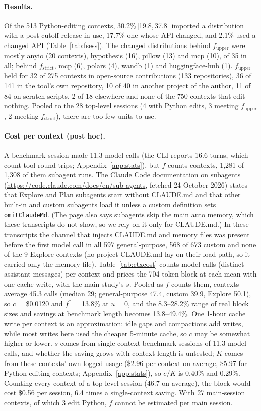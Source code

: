 \documentclass[11pt]{article}
\newcommand{\ci}[2]{\,[#1,\,#2]}
\newcommand{\code}[1]{\texttt{#1}}
\begin{document}
\paragraph{Results.}
Of the 513 Python-editing contexts, 30.2\%\ci{19.8}{37.8} imported a distribution with a post-cutoff release in use, 17.7\% one whose API changed, and 2.1\% used a changed API (Table~\ref{tab:fsess}).
The changed distributions behind $f_\text{upper}$ were mostly anyio (20 contexts), hypothesis (16), pillow (13) and mcp (10), of 35 in all; behind $f_\text{strict}$, mcp (6), polars (4), wandb (1) and huggingface-hub (1).
$f_\text{upper}$ held for 32 of 275 contexts in open-source contributions (133 repositories), 36 of 141 in the tool's own repository, 10 of 40 in another project of the author, 11 of 84 on scratch scripts, 2 of 18 elsewhere and none of the 750 contexts that edit nothing.
Pooled to the 28 top-level sessions (4 with Python edits, 3 meeting $f_\text{upper}$, 2 meeting $f_\text{strict}$), there are too few units to use.

\paragraph{Cost per context (post hoc).}
A benchmark session made 11.3 model calls (the CLI reports 16.6 turns, which count tool round trips; Appendix~\ref{app:stats}), but $f$ counts contexts, 1,281 of 1,308 of them subagent runs. The Claude Code documentation on subagents (\url{https://code.claude.com/docs/en/sub-agents}, fetched 24 October 2026) states that Explore and Plan subagents start without CLAUDE.md and that other built-in and custom subagents load it unless a custom definition sets \code{omitClaudeMd}. (The page also says subagents skip the main auto memory, which these transcripts do not show, so we rely on it only for CLAUDE.md.) In these transcripts the channel that injects CLAUDE.md and memory files was present before the first model call in all 597 general-purpose, 568 of 673 custom and none of the 9 Explore contexts (no project CLAUDE.md lay on their load path, so it carried only the memory file). Table~\ref{tab:ctxcost} counts model calls (distinct assistant messages) per context and prices the 704-token block at each mean with one cache write, with the main study's $s$. Pooled as $f$ counts them, contexts average 45.3 calls (median 29; general-purpose 47.4, custom 39.9, Explore 50.1), so $c$ = \$0.0120 and $f^{*}$ = 13.8\% at $u = 0$, and the 8.3--28.2\% range of real block sizes and savings at benchmark length becomes 13.8--49.4\%. One 1-hour cache write per context is an approximation: idle gaps and compactions add writes, while most writes here used the cheaper 5-minute cache, so $c$ may be somewhat higher or lower. $s$ comes from single-context benchmark sessions of 11.3 model calls, and whether the saving grows with context length is untested; $K$ comes from these contexts' own logged usage (\$2.96 per context on average, \$5.97 for Python-editing contexts; Appendix~\ref{app:stats}), so $c/K$ is 0.40\% and 0.29\%. Counting every context of a top-level session (46.7 on average), the block would cost \$0.56 per session, 6.4 times a single-context saving. With 27 main-session contexts, of which 3 edit Python, $f$ cannot be estimated per main session.
\end{document}
